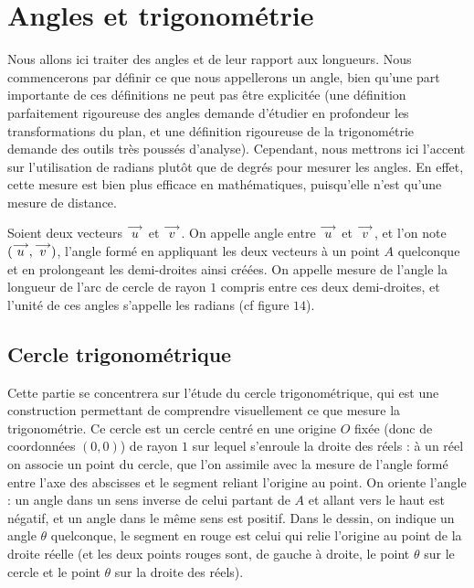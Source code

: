 \section{Angles et trigonométrie}

Nous allons ici traiter des angles et de leur rapport aux longueurs. Nous commencerons par définir ce que nous appellerons un angle, bien qu'une part importante de ces définitions ne peut pas être explicitée (une définition parfaitement rigoureuse des angles demande d'étudier en profondeur les transformations du plan, et une définition rigoureuse de la trigonométrie demande des outils très poussés d'analyse). Cependant, nous mettrons ici l'accent sur l'utilisation de radians plutôt que de degrés pour mesurer les angles. En effet, cette mesure est bien plus efficace en mathématiques, puisqu'elle n'est qu'une mesure de distance.

\begin{defi}[Angle]
    Soient deux vecteurs $\overset{\longrightarrow}{u}$ et $\overset{\longrightarrow}{v}$. On appelle angle entre $\overset{\longrightarrow}{u}$ et $\overset{\longrightarrow}{v}$, et l'on note $(\overset{\longrightarrow}{u},\overset{\longrightarrow}{v})$, l'angle formé en appliquant les deux vecteurs à un point $A$ quelconque et en prolongeant les demi-droites ainsi créées. On appelle mesure de l'angle la longueur de l'arc de cercle de rayon $1$ compris entre ces deux demi-droites, et l'unité de ces angles s'appelle les radians (cf figure $14$).
\end{defi}


\subsection{Cercle trigonométrique}

Cette partie se concentrera sur l'étude du cercle trigonométrique, qui est une construction permettant de comprendre visuellement ce que mesure la trigonométrie. Ce cercle est un cercle centré en une origine $O$ fixée (donc de coordonnées $(0,0)$) de rayon $1$ sur lequel s'enroule la droite des réels : à un réel on associe un point du cercle, que l'on assimile avec la mesure de l'angle formé entre l'axe des abscisses et le segment reliant l'origine au point. On oriente l'angle : un angle dans un sens inverse de celui partant de $A$ et allant vers le haut est négatif, et un angle dans le même sens est positif. Dans le dessin, on indique un angle $\theta$ quelconque, le segment en rouge est celui qui relie l'origine au point de la droite réelle (et les deux points rouges sont, de gauche à droite, le point $\theta$ sur le cercle et le point $\theta$ sur la droite des réels).

